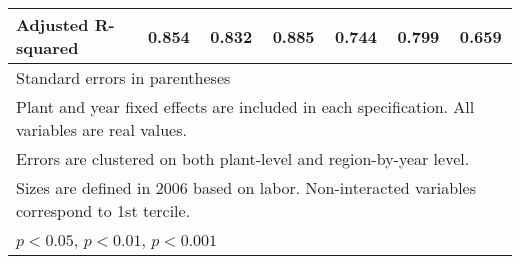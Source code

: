 \begin{table}[htbp]
\begin{tabular}{l*{6}{c}}
Adjusted R-squared&    0.854         &    0.832         &    0.885         &    0.744         &    0.799         &    0.659         \\
\bottomrule
\multicolumn{7}{l}{\footnotesize Standard errors in parentheses}\\
\multicolumn{7}{l}{\footnotesize Plant and year fixed effects are included in each specification. All variables are real values.}\\
\multicolumn{7}{l}{\footnotesize Errors are clustered on both plant-level and region-by-year level.}\\
\multicolumn{7}{l}{\footnotesize Sizes are defined in 2006 based on labor. Non-interacted variables correspond to 1st tercile.}\\
\multicolumn{7}{l}{\footnotesize \sym{*} \(p<0.05\), \sym{**} \(p<0.01\), \sym{***} \(p<0.001\)}\\
\end{tabular}
\end{table}
